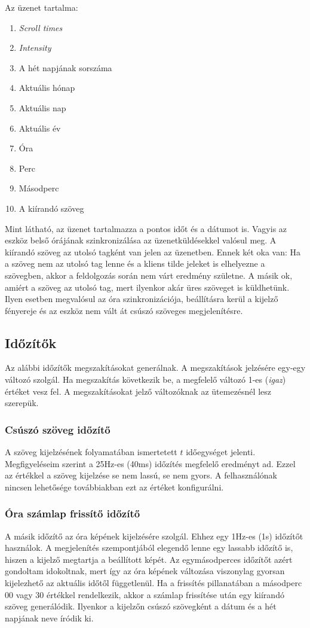 \documentclass[a4paper, 12pt]{article}
\begin{document}
Az üzenet tartalma:
\begin{enumerate}[nolistsep]
 \item \textit{Scroll times}
 \item \textit{Intensity}
 \item A hét napjának sorszáma
 \item Aktuális hónap
 \item Aktuális nap
 \item Aktuális év
 \item Óra
 \item Perc
 \item Másodperc
 \item A kiírandó szöveg 
\end{enumerate}

Mint látható, az üzenet tartalmazza a pontos időt és a dátumot is. Vagyis az eszköz belső órájának szinkronizálása az üzenetküldésekkel valósul meg. A kiírandó szöveg az utolsó tagként van jelen az üzenetben. Ennek két oka van: Ha a szöveg nem az utolsó tag lenne és a kliens tilde jeleket is elhelyezne a szövegben, akkor a feldolgozás során nem várt eredmény születne. A másik ok, amiért a szöveg az utolsó tag, mert ilyenkor akár üres szöveget is küldhetünk. Ilyen esetben megvalósul az óra szinkronizációja, beállításra kerül a kijelző fényereje és az eszköz nem vált át csúszó szöveges megjelenítésre.

\subsection{Időzítők}

Az alábbi időzítők megszakításokat generálnak. A megszakítások jelzésére egy-egy változó szolgál. Ha megszakítás következik be, a megfelelő változó 1-es (\textit{igaz}) értéket vesz fel. A megszakításokat jelző változóknak az ütemezésnél lesz szerepük.

\subsubsection{Csúszó szöveg időzítő}
A szöveg kijelzésének folyamatában ismertetett $t$ időegységet jelenti. Megfigyeléseim szerint a 25Hz-es (40ms) időzítés megfelelő eredményt ad. Ezzel az értékkel a szöveg kijelzése se nem lassú, se nem gyors. A felhasználónak nincsen lehetősége továbbiakban ezt az értéket konfigurálni.

\subsubsection{Óra számlap frissítő időzítő}
A másik időzítő az óra képének kijelzésére szolgál. Ehhez egy 1Hz-es (1s) időzítőt használok. A megjelenítés szempontjából elegendő lenne egy lassabb időzítő is, hiszen a kijelző megtartja a beállított képét. Az egymásodperces időzítőt azért gondoltam idokoltnak, mert így az óra képének változása viszonylag gyorsan kijelezhető az aktuális időtől függetlenül.
Ha a frissítés pillanatában a másodperc 00 vagy 30 értékkel rendelkezik, akkor a számlap frissítése után egy kiírandó szöveg generálódik. Ilyenkor a kijelzőn csúszó szövegként a dátum és a hét napjának neve íródik ki.
\end{document}
